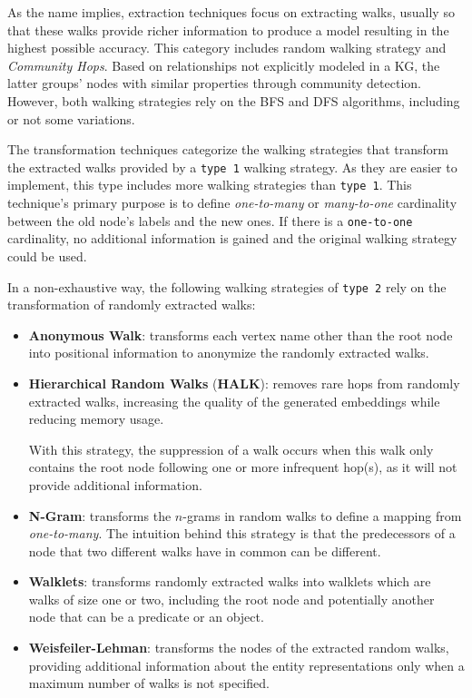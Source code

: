 As the name implies, extraction techniques focus on extracting walks, usually so
that these walks provide richer information to produce a model resulting in the
highest possible accuracy. This category includes random walking strategy and
\emph{Community Hops}. Based on relationships not explicitly modeled in a KG,
the latter groups' nodes with similar properties through community detection. However,
both walking strategies rely on the BFS and DFS algorithms, including or not
some variations.

The transformation techniques categorize the walking strategies that transform
the extracted walks provided by a \texttt{type 1} walking strategy. As they are
easier to implement, this type includes more walking strategies than
\texttt{type 1}. This technique's primary purpose is to define
\emph{one-to-many} or \emph{many-to-one} cardinality between the old node's
labels and the new ones. If there is a \texttt{one-to-one} cardinality, no
additional information is gained and the original walking strategy could be
used.

In a non-exhaustive way, the following walking strategies of \texttt{type 2}
rely on the transformation of randomly extracted walks:
\begin{itemize}
\item \textbf{Anonymous Walk}: transforms each vertex name other than the root
node into positional information to anonymize the randomly extracted walks.

\item \textbf{Hierarchical Random Walks} (\textbf{HALK}): removes rare hops from randomly
extracted walks, increasing the quality of the generated embeddings while
reducing memory usage.

With this strategy, the suppression of a walk occurs when this walk only
contains the root node following one or more infrequent hop(s), as it will not
provide additional information.

\item \textbf{N-Gram}: transforms the $n$-grams in random walks to define a
mapping from \emph{one-to-many}. The intuition behind this strategy is that the
predecessors of a node that two different walks have in common can be different.

\item \textbf{Walklets}: transforms randomly extracted walks into walklets which
are walks of size one or two, including the root node and potentially another
node that can be a predicate or an object.

\item \textbf{Weisfeiler-Lehman}: transforms the nodes of the extracted random
walks, providing additional information about the entity representations only
when a maximum number of walks is not specified.
\end{itemize}

